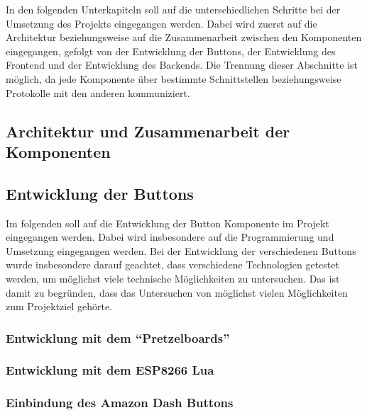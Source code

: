 In den folgenden Unterkapiteln soll auf die unterschiedlichen Schritte bei der Umsetzung des Projekts eingegangen werden. Dabei wird zuerst auf die Architektur beziehungsweise auf die Zusammenarbeit zwischen den Komponenten eingegangen, gefolgt von der Entwicklung der Buttons, der Entwicklung des Frontend und der Entwicklung des Backends. Die Trennung dieser Abschnitte ist möglich, da jede Komponente über bestimmte Schnittstellen beziehungsweise Protokolle mit den anderen kommuniziert. 

\subsection{Architektur und Zusammenarbeit der Komponenten}        
\label{sec:Architektur und Zusammenarbeit der Komponenten-1} 



\newpage

\subsection{Entwicklung der Buttons}  
\label{sec:Entwicklung der Buttons-1} 

Im folgenden soll auf die Entwicklung der Button Komponente im Projekt eingegangen werden. Dabei wird insbesondere auf die Programmierung und Umsetzung eingegangen werden. 
Bei der Entwicklung der verschiedenen Buttons wurde insbesondere darauf geachtet, dass verschiedene Technologien getestet werden, um möglichst viele technische Möglichkeiten zu untersuchen. Das ist damit zu begründen, dass das Untersuchen von möglichst vielen Möglichkeiten zum Projektziel gehörte. 

\subsubsection{Entwicklung mit dem ``Pretzelboards''}  
\label{sec:Entwicklung mit dem ``Pretzelboards''-1}


\subsubsection{Entwicklung mit dem ESP8266 Lua}  
\label{sec:Entwicklung mit dem ESP8266-1}


\newpage

\subsubsection{Einbindung des Amazon Dash Buttons}  
\label{sec:Einbindung des Amazon Dash Buttons-1}


